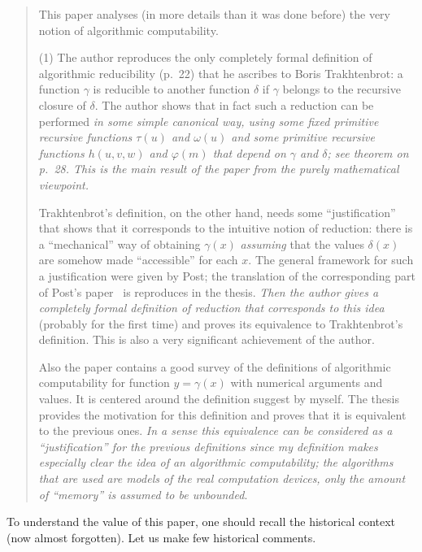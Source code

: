 \documentclass[12pt]{article}
\theoremstyle{remark}
\begin{document}
\begin{quote}

This paper analyses (in more details than it was done before) the very notion of algorithmic  computability.

(1) The author reproduces the only completely formal definition of algorithmic reducibility (p.~22) that he ascribes to Boris Trakhtenbrot: a function $\gamma$ is reducible to another function $\delta$ if $\gamma$ belongs to the recursive closure of $\delta$. The author shows that in fact such a reduction can be performed \emph{in some simple canonical way, using some fixed primitive recursive functions $\tau(u)$ and $\omega(u)$ and some primitive recursive functions $h(u,v,w)$ and $\varphi(m)$ that depend on $\gamma$ and $\delta$; see theorem on p.~28. This is the main result of the paper from the purely mathematical viewpoint.}

Trakhtenbrot's definition, on the other hand, needs some ``justification'' that shows that it corresponds to the intuitive notion of reduction: there is a ``mechanical'' way of obtaining $\gamma(x)$ \emph{assuming} that the values $\delta(x)$ are somehow made ``accessible'' for each $x$. The general framework for such a justification were given by Post; the translation of the corresponding part of Post's paper~\cite{Post1944} is reproduces in the thesis. \emph{Then the author gives a completely formal definition of reduction that corresponds to this idea} (probably for the first time) and proves its equivalence to Trakhtenbrot's definition. This is also a very significant achievement of the author.

Also the paper contains a good survey of the definitions of algorithmic computability for function $y=\gamma(x)$ with numerical arguments and values. It is centered around the definition suggest by myself. The thesis provides the motivation for this definition and proves that it is equivalent to the previous ones. \emph{In a sense this equivalence can be considered as a ``justification'' for the previous definitions since my definition makes especially clear the idea of an algorithmic computability; the algorithms that are used are models of the real computation devices, only the amount of ``memory'' is assumed to be unbounded}. 

\end{quote}

To understand the value of this paper, one should recall the historical context (now almost forgotten). Let us make few historical comments.
\end{document}
